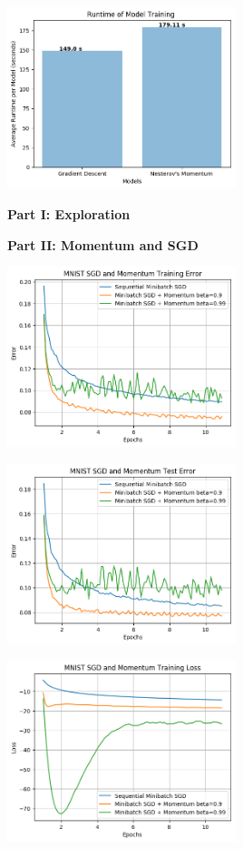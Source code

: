 \documentclass[10pt]{article}
\begin{document}
\begin{center}
    \includegraphics[width=0.5\textwidth]{train_time_part1.png}
\end{center}



\textbf{Part I: Exploration}


\textbf{Part II: Momentum and SGD}

\begin{center}
    \includegraphics[width=0.5\textwidth]{SGDandMomentumTrainingError.png}
\end{center}
\begin{center}
    \includegraphics[width=0.5\textwidth]{SGDandMomentumTestError.png}
\end{center}
\begin{center}
    \includegraphics[width=0.5\textwidth]{SGDandMomentumTrainingLoss.png}
\end{center}
\end{document}

